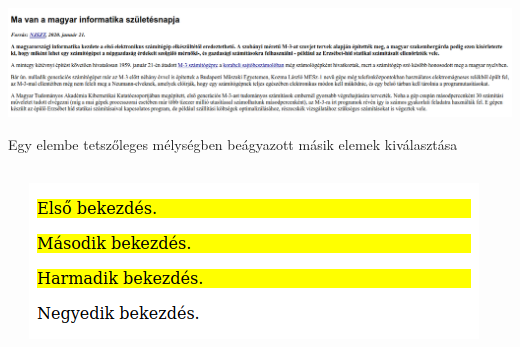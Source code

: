 \begin{frame}
  \begin{exampleblock}{}
    \scriptsize
    
  \end{exampleblock}
\end{frame}

\begin{frame}
  \begin{exampleblock}{}
    \scriptsize
    
  \end{exampleblock}
  \begin{center}
    \includegraphics[width=.9\textwidth]{egyszeruSzelektor1.png}
  \end{center}
\end{frame}

\begin{frame}
  Egy elembe tetszőleges mélységben beágyazott másik elemek kiválasztása
  \begin{columns}[c]
      \begin{exampleblock}{}
        \footnotesize
        
        
      \end{exampleblock}
      \includegraphics[width=\textwidth]{leszarmazott.png}
  \end{columns}
\end{frame}

